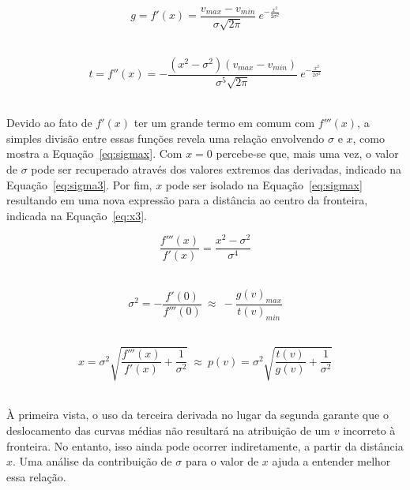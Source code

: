 \begin{equation} \label{eq:first2}
g = f'(x) = \frac{v_{max} - v_{min}}{\sigma\sqrt{2\pi}}\ e^{-\frac{x^{2}}{2\sigma^{2}}}
\end{equation} \

\begin{equation} \label{eq:third}
t = f''(x) = -\frac{(x^{2} - \sigma^{2})(v_{max} - v_{min})}{\sigma^{5}\sqrt{2\pi}}\ e^{-\frac{x^{2}}{2\sigma^{2}}}
\end{equation} \
	
	Devido ao fato de $ f'(x) $ ter um grande termo em comum com $ f'''(x) $, a simples divisão entre essas funções revela uma relação envolvendo $ \sigma $ e $ x $, como mostra a Equação~\eqref{eq:sigmax}. Com $ x = 0 $ percebe-se que, mais uma vez, o valor de $ \sigma $ pode ser recuperado através dos valores extremos das derivadas, indicado na Equação~\eqref{eq:sigma3}. Por fim, $ x $ pode ser isolado na Equação~\eqref{eq:sigmax} resultando em uma nova expressão para a distância ao centro da fronteira, indicada na Equação~\eqref{eq:x3}.
	

\begin{equation} \label{eq:sigmax}
	\frac{f'''(x)}{f'(x)} = \frac{x^{2} - \sigma^{2}}{\sigma^{4}}
\end{equation} \

\begin{equation} \label{eq:sigma3}
	\sigma^{2} = -\frac{f'(0)}{f'''(0)} \ \approx \ -\frac{g(v)_{max}}{t(v)_{min}}
\end{equation} \

\begin{equation} \label{eq:x3}
	x = \sigma^{2}\sqrt{\frac{f'''(x)}{f'(x)} + \frac{1}{\sigma^{2}}} \ \approx \ 
	p(v) = \sigma^{2}\sqrt{\frac{t(v)}{g(v)} + \frac{1}{\sigma^{2}}}
\end{equation} \

	À primeira vista, o uso da terceira derivada no lugar da segunda garante que o deslocamento das curvas médias não resultará na atribuição de um $ v $ incorreto à fronteira. No entanto, isso ainda pode ocorrer indiretamente, a partir da distância $ x $. Uma análise da contribuição de $ \sigma $ para o valor de $ x $ ajuda a entender melhor essa relação.
	
